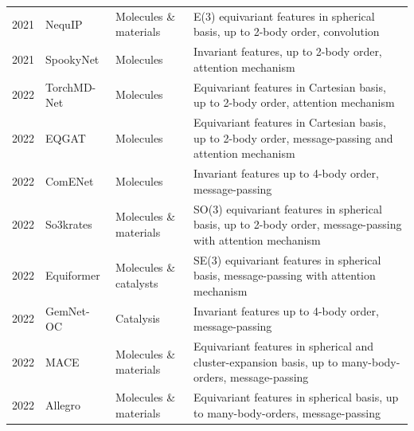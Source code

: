 \begin{longtable}{p{1.25cm}p{2.5cm}p{3cm}p{10.25cm}}
\footnotesize{2021} &
\footnotesize{NequIP\cite{batzner20223}} &
\footnotesize{Molecules \& materials} &
\footnotesize{E(3) equivariant features in spherical basis, up to 2-body order, convolution}\\

\footnotesize{2021} &
\footnotesize{SpookyNet\cite{unke2021spookynet}} &
\footnotesize{Molecules} &
\footnotesize{Invariant features, up to 2-body order, attention mechanism}\\

\footnotesize{2022} &
\footnotesize{TorchMD-Net\cite{tholke2022torchmd}} &
\footnotesize{Molecules} &
\footnotesize{Equivariant features in Cartesian basis, up to 2-body order, attention mechanism}\\

\footnotesize{2022} &
\footnotesize{EQGAT\cite{le2022equivariant}} &
\footnotesize{Molecules} &
\footnotesize{Equivariant features in Cartesian basis, up to 2-body order, message-passing and attention mechanism}\\

\footnotesize{2022} &
\footnotesize{ComENet\cite{wang2022comenet}} &
\footnotesize{Molecules} &
\footnotesize{Invariant features up to 4-body order, message-passing}\\

\footnotesize{2022} &
\footnotesize{So3krates\cite{frank2022so3krates}} &
\footnotesize{Molecules \& materials} &
\footnotesize{SO(3) equivariant features in spherical basis, up to 2-body order, message-passing with attention mechanism}\\

\footnotesize{2022} &
\footnotesize{Equiformer\cite{liao2022equiformer}} &
\footnotesize{Molecules \& catalysts} &
\footnotesize{SE(3) equivariant features in spherical basis, message-passing with attention mechanism}\\

\footnotesize{2022} &
\footnotesize{GemNet-OC\cite{gasteiger2022gemnet}} &
\footnotesize{Catalysis} &
\footnotesize{Invariant features up to 4-body order, message-passing}\\

\footnotesize{2022} &
\footnotesize{MACE\cite{batatia2022mace}} &
\footnotesize{Molecules \& materials} &
\footnotesize{Equivariant features in spherical and cluster-expansion basis, up to many-body-orders, message-passing}\\

\footnotesize{2022} &
\footnotesize{Allegro\cite{musaelian2023learning}} &
\footnotesize{Molecules \& materials} &
\footnotesize{Equivariant features in spherical basis, up to many-body-orders, message-passing}\\


\end{longtable}
